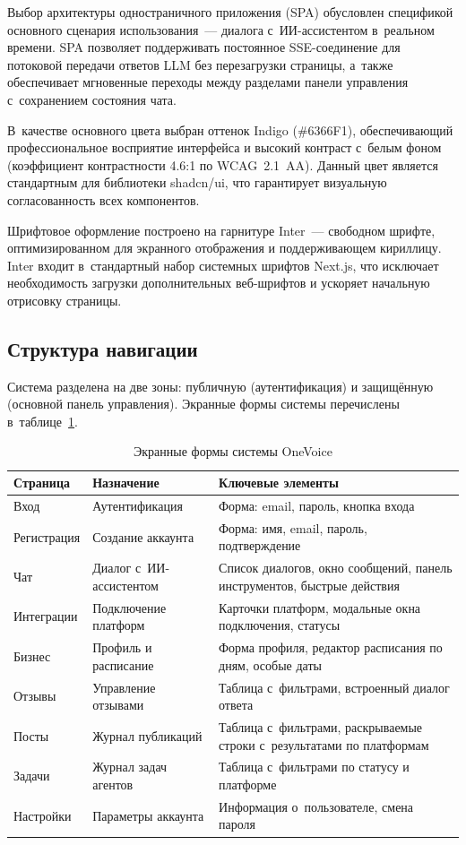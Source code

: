 Выбор архитектуры одностраничного приложения (SPA) обусловлен спецификой основного сценария использования~--- диалога с~ИИ-ассистентом в~реальном времени. SPA позволяет поддерживать постоянное SSE-соединение для потоковой передачи ответов LLM без перезагрузки страницы, а~также обеспечивает мгновенные переходы между разделами панели управления с~сохранением состояния чата.

В~качестве основного цвета выбран оттенок Indigo (\#6366F1), обеспечивающий профессиональное восприятие интерфейса и высокий контраст с~белым фоном (коэффициент контрастности 4.6:1 по WCAG~2.1~AA). Данный цвет является стандартным для библиотеки shadcn/ui, что гарантирует визуальную согласованность всех компонентов.

Шрифтовое оформление построено на гарнитуре Inter~--- свободном шрифте, оптимизированном для экранного отображения и поддерживающем кириллицу. Inter входит в~стандартный набор системных шрифтов Next.js, что исключает необходимость загрузки дополнительных веб-шрифтов и ускоряет начальную отрисовку страницы.

\subsection{Структура навигации}
\label{subsec:navigation}

Система разделена на две зоны: публичную (аутентификация) и защищённую (основной панель управления). Экранные формы системы перечислены в~таблице~\ref{tab:screens}.

\begin{table}[H]
  \caption{Экранные формы системы OneVoice}
  \label{tab:screens}
  \small
  \begin{tabularx}{\textwidth}{|p{2.5cm}|p{3cm}|X|}
    \hline
    \textbf{Страница} & \textbf{Назначение} & \textbf{Ключевые элементы} \\
    \hline
    Вход & Аутентификация & Форма: email, пароль, кнопка входа \\
    \hline
    Регистрация & Создание аккаунта & Форма: имя, email, пароль, подтверждение \\
    \hline
    Чат & Диалог с~ИИ-ассистентом & Список диалогов, окно сообщений, панель инструментов, быстрые действия \\
    \hline
    Интеграции & Подключение платформ & Карточки платформ, модальные окна подключения, статусы \\
    \hline
    Бизнес & Профиль и расписание & Форма профиля, редактор расписания по дням, особые даты \\
    \hline
    Отзывы & Управление отзывами & Таблица с~фильтрами, встроенный диалог ответа \\
    \hline
    Посты & Журнал публикаций & Таблица с~фильтрами, раскрываемые строки с~результатами по платформам \\
    \hline
    Задачи & Журнал задач агентов & Таблица с~фильтрами по статусу и платформе \\
    \hline
    Настройки & Параметры аккаунта & Информация о~пользователе, смена пароля \\
    \hline
  \end{tabularx}
\end{table}


